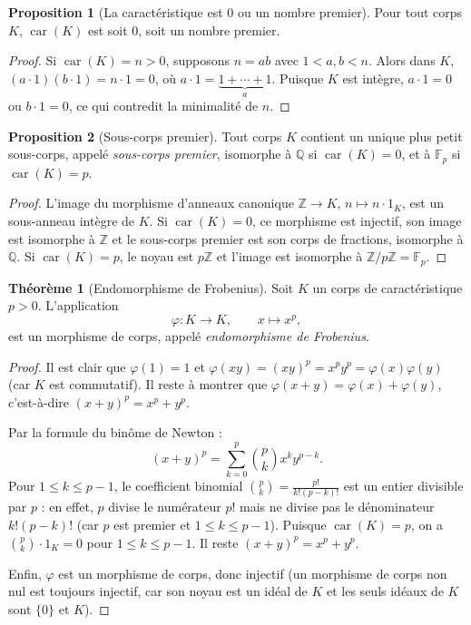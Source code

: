 \documentclass[12pt,a4paper,openany]{book}
\theoremstyle{definition}
\newtheorem{theoreme}{Théorème}[chapter]
\newtheorem{proposition}{Proposition}[chapter]
\newcommand{\Z}{\mathbb{Z}}
\newcommand{\Q}{\mathbb{Q}}
\newcommand{\F}{\mathbb{F}}
\newcommand{\car}{\operatorname{car}}
\begin{document}
\begin{proposition}[La caractéristique est $0$ ou un nombre premier]
\label{prop:car-premier}
Pour tout corps $K$, $\car(K)$ est soit $0$, soit un nombre premier.
\end{proposition}

\begin{proof}
Si $\car(K) = n > 0$, supposons $n = ab$ avec $1 < a, b < n$. Alors dans $K$,
$(a \cdot 1)(b \cdot 1) = n \cdot 1 = 0$, où $a \cdot 1 = \underbrace{1 + \cdots + 1}_{a}$.
Puisque $K$ est intègre, $a \cdot 1 = 0$ ou $b \cdot 1 = 0$, ce qui contredit
la minimalité de $n$.
\end{proof}

\begin{proposition}[Sous-corps premier]\label{prop:sous-corps-premier}
Tout corps $K$ contient un unique plus petit sous-corps, appelé \emph{sous-corps
premier}, isomorphe à $\Q$ si $\car(K) = 0$, et à $\F_p$ si $\car(K) = p$.
\end{proposition}

\begin{proof}
L'image du morphisme d'anneaux canonique $\Z \to K$, $n \mapsto n \cdot 1_K$,
est un sous-anneau intègre de $K$. Si $\car(K) = 0$, ce morphisme est injectif,
son image est isomorphe à $\Z$ et le sous-corps premier est son corps de
fractions, isomorphe à $\Q$. Si $\car(K) = p$, le noyau est $p\Z$ et l'image
est isomorphe à $\Z/p\Z = \F_p$.
\end{proof}

\begin{theoreme}[Endomorphisme de Frobenius]\label{thm:frobenius}
Soit $K$ un corps de caractéristique $p > 0$. L'application
\[
  \varphi \colon K \to K, \qquad x \mapsto x^p,
\]
est un morphisme de corps, appelé \emph{endomorphisme de Frobenius}.
\end{theoreme}

\begin{proof}
Il est clair que $\varphi(1) = 1$ et $\varphi(xy) = (xy)^p = x^p y^p =
\varphi(x)\varphi(y)$ (car $K$ est commutatif). Il reste à montrer que
$\varphi(x + y) = \varphi(x) + \varphi(y)$, c'est-à-dire
$(x+y)^p = x^p + y^p$.

Par la formule du binôme de Newton :
\[
  (x+y)^p = \sum_{k=0}^{p} \binom{p}{k} x^k y^{p-k}.
\]
Pour $1 \leq k \leq p-1$, le coefficient binomial
$\binom{p}{k} = \frac{p!}{k!(p-k)!}$ est un entier divisible par $p$ : en effet,
$p$ divise le numérateur $p!$ mais ne divise pas le dénominateur $k!(p-k)!$
(car $p$ est premier et $1 \leq k \leq p-1$). Puisque $\car(K) = p$, on a
$\binom{p}{k} \cdot 1_K = 0$ pour $1 \leq k \leq p-1$. Il reste
$(x+y)^p = x^p + y^p$.

Enfin, $\varphi$ est un morphisme de corps, donc injectif (un morphisme de
corps non nul est toujours injectif, car son noyau est un idéal de $K$ et les
seuls idéaux de $K$ sont $\{0\}$ et $K$).
\end{proof}
\end{document}
